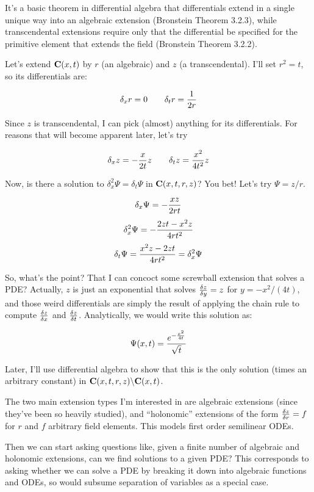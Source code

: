 \documentclass{article}
\newcommand{\C}{\ensuremath{{\bf C}}}
\begin{document}
It's a basic theorem in differential algebra that differentials extend
in a single unique way into an algebraic extension (Bronstein Theorem
3.2.3), while transcendental extensions require only that the
differential be specified for the primitive element that extends the
field (Bronstein Theorem 3.2.2).

Let's extend $\C(x,t)$ by $r$ (an algebraic) and $z$ (a
transcendental).  I'll set $r^2 = t$, so its differentials are:

$$\delta_x r = 0 \qquad \delta_t r = {1\over{2r}} $$


Since $z$ is transcendental, I can pick (almost) anything for its differentials.  For
reasons that will become apparent later, let's try

$$\delta_x z = -{{x}\over{2t}} z \qquad \delta_t z = {x^2\over{4t^2}} z$$

Now, is there a solution to $\delta_x^2 \Psi = \delta_t \Psi$ in
$\C(x,t,r,z)$?  You bet!  Let's try $\Psi = z/r$.

$$\delta_x \Psi = - {xz\over{2rt}}$$
$$\delta_x^2 \Psi = - {{2zt-x^2z}\over{4rt^2}}$$
$$\delta_t \Psi =  {{x^2z - 2zt}\over{4rt^2}} = \delta_x^2 \Psi$$

So, what's the point?  That I can concoct some screwball extension
that solves a PDE?  Actually, $z$ is just an exponential that solves
${{\delta z}\over{\delta y}}=z$ for $y=-x^2/(4t)$, and those weird
differentials are simply the result of applying the chain rule
to compute ${{\delta z}\over{\delta x}}$ and ${{\delta z}\over{\delta t}}$.
Analytically, we would write this solution as:

$$\Psi(x,t) = {e^{-{x^2\over{4t}}}\over{\sqrt{t}}}$$

Later, I'll use differential algebra to show that this is the only
solution (times an arbitrary constant) in $\C(x,t,r,z) \backslash \C(x,t)$.

The two main extension types I'm interested in are algebraic
extensions (since they've been so heavily studied), and ``holonomic''
extensions of the form ${{\delta z}\over{\delta r}} = f$ for $r$ and
$f$ arbitrary field elements.  This models first order semilinear ODEs.

Then we can start asking questions like, given a finite number of
algebraic and holonomic extensions, can we find solutions to a given
PDE?  This corresponds to asking whether we can solve a PDE by
breaking it down into algebraic functions and ODEs, so would subsume
separation of variables as a special case.
\end{document}

